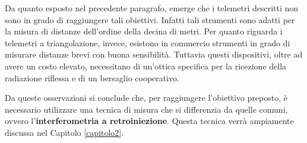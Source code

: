 Da quanto esposto nel precedente paragrafo, emerge che i telemetri descritti non sono in grado di raggiungere tali obiettivi. Infatti tali strumenti sono adatti per la misura di distanze dell'ordine della decina di metri. Per quanto riguarda i telemetri a triangolazione, invece, esistono in commercio strumenti in grado di misurare distanze brevi con buona sensibilità. Tuttavia questi dispositivi, oltre ad avere un costo elevato, necessitano di un'ottica specifica per la ricezione della radiazione riflessa e di un bersaglio cooperativo.

Da queste osservazioni si conclude che, per raggiungere l'obiettivo preposto, è necessario utilizzare una tecnica di misura che si differenzia da quelle comuni, ovvero l'\textbf{interferometria a retroiniezione}. Questa tecnica verrà ampiamente discussa nel Capitolo \ref{capitolo2}.











 







